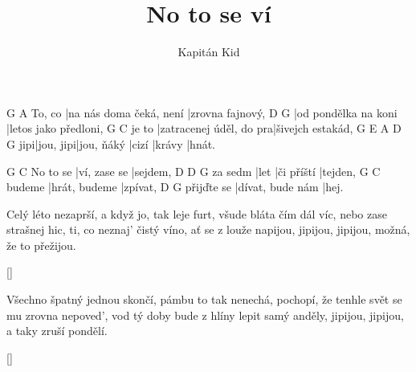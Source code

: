 \documentclass{song}
\title{No to se ví}
\author{Kapitán Kid}
\begin{document}
\strophe
       G                       A
To, co |na nás doma čeká, není |zrovna fajnový,
D                    G
|od pondělka na koni |letos jako předloni,
      G                       C
je to |zatracenej úděl, do pra|šivejch estakád,
    G         E\7        A\7   D\7    G
jipi|jou, jipi|jou, ňáký |cizí |krávy |hnát.
\endstrophe

         G            C
No to se |ví, zase se |sejdem,
        D    D\7        G
za sedm |let |či příští |tejden,
       G				C
budeme |hrát, budeme |zpívat,
           D\7              G
přijďte se |dívat, bude nám |hej.
\endstrophe

\strophe*
Celý léto nezaprší, a když jo, tak leje furt,
všude bláta čím dál víc, nebo zase strašnej hic,
ti, co neznaj' čistý víno, ať se z louže napijou,
jipijou, jipijou, možná, že to přežijou.
\endstrophe

\ref{}

\strophe*
Všechno špatný jednou skončí, pámbu to tak nenechá,
pochopí, že tenhle svět se mu zrovna nepoved',
vod tý doby bude z hlíny lepit samý anděly,
jipijou, jipijou, a taky zruší pondělí.
\endstrophe

\ref{}
\end{document}
